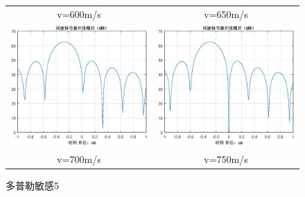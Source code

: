 \documentclass[12pt]{article}
\begin{document}
\begin{figure}[htbp]
\begin{tabular}{cc}
    v=600m/s&v=650m/s\\
  \includegraphics[width=.5\textwidth]{Doppler_sensitivity_0700}&\includegraphics[width=.5\textwidth]{Doppler_sensitivity_0750}\\
    v=700m/s&v=750m/s\\
  \end{tabular}
  \caption{多普勒敏感5}\label{Doppler_sensitivity_0005}
\end{figure}
\end{document}
